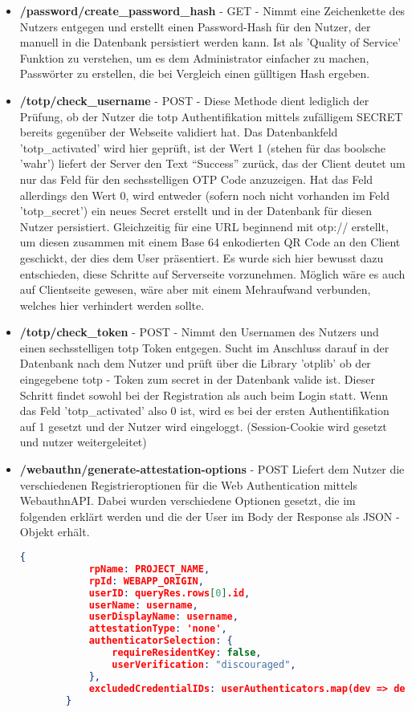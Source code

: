 \begin{enumerate}
\begin{itemize}
 \item \textbf{/password/create\_password\_hash} - GET - Nimmt eine Zeichenkette des Nutzers entgegen und erstellt einen Password-Hash für den Nutzer, der manuell in die Datenbank persistiert werden kann. Ist als 'Quality of Service' Funktion zu verstehen, um es dem Administrator einfacher zu machen, Passwörter zu erstellen, die bei Vergleich einen gülltigen Hash ergeben.
 
 \item \textbf{/totp/check\_username} - POST - Diese Methode dient lediglich der Prüfung, ob der Nutzer die \ac{totp} Authentifikation mittels zufälligem SECRET bereits gegenüber der Webseite validiert hat. Das Datenbankfeld 'totp\_activated' wird hier geprüft, ist der Wert 1 (stehen für das boolsche 'wahr') liefert der Server den Text ``Success'' zurück, das der Client deutet um nur das Feld für den sechsstelligen OTP Code anzuzeigen. Hat das Feld allerdings den Wert 0, wird entweder (sofern noch nicht vorhanden im Feld 'totp\_secret') ein neues Secret erstellt und in der Datenbank für diesen Nutzer persistiert. Gleichzeitig für eine URL beginnend mit otp:// erstellt, um diesen zusammen mit einem Base 64 enkodierten QR Code an den Client geschickt, der dies dem User präsentiert. Es wurde sich hier bewusst dazu entschieden, diese Schritte auf Serverseite vorzunehmen. Möglich wäre es auch auf Clientseite gewesen, wäre aber mit einem Mehraufwand verbunden, welches hier verhindert werden sollte.
 
 \item \textbf{/totp/check\_token} - POST - Nimmt den Usernamen des Nutzers und einen sechsstelligen \ac{totp} Token entgegen. Sucht im Anschluss darauf in der Datenbank nach dem Nutzer und prüft über die Library 'otplib' ob der eingegebene \ac{totp} - Token zum secret in der Datenbank valide ist. Dieser Schritt findet sowohl bei der Registration als auch beim Login statt. Wenn das Feld 'totp\_activated' also 0 ist, wird es bei der ersten Authentifikation auf 1 gesetzt und der Nutzer wird eingeloggt. (Session-Cookie wird gesetzt und nutzer weitergeleitet)
 \newpage

 \item \textbf{/webauthn/generate-attestation-options} - POST
 Liefert dem Nutzer die verschiedenen Registrieroptionen für die Web Authentication mittels WebauthnAPI. Dabei wurden verschiedene Optionen gesetzt, die im folgenden erklärt werden und die der User im Body der Response als JSON - Objekt erhält.
 
 \begin{lstlisting}[language=json,firstnumber=1]
        {
            rpName: PROJECT_NAME,
            rpId: WEBAPP_ORIGIN,
            userID: queryRes.rows[0].id,
            userName: username,
            userDisplayName: username,
            attestationType: 'none',
            authenticatorSelection: {
                requireResidentKey: false,
                userVerification: "discouraged",
            },
            excludedCredentialIDs: userAuthenticators.map(dev => dev.credentialID),
        }
\end{lstlisting}


\end{itemize}
\end{enumerate}
